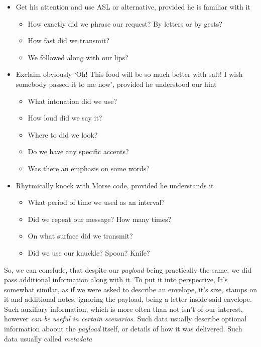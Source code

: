 \documentclass{article}
\begin{document}
\begin{itemize}
                \item Get his attention and use ASL or alternative, provided he is familiar with it
                \begin{itemize}
                    \item How exactly did we phrase our request? By letters or by gests?
                    \item How fast did we transmit?
                    \item We followed along with our lips?
                \end{itemize}

                \item Exclaim obviously `Oh! This food will be so much better with salt! I wish somebody passed it to me now', provided he understood our hint
                \begin{itemize}
                    \item What intonation did we use?
                    \item How loud did we say it?
                    \item Where to did we look?
                    \item Do we have any specific accents?
                    \item Was there an emphasis on some words?
                \end{itemize}

                \item Rhytmically knock with Morse code, provided he understands it
                \begin{itemize}
                    \item What period of time we used as an interval?
                    \item Did we repeat our message? How many times?
                    \item On what surface did we transmit?
                    \item Did we use our knuckle? Spoon? Knife?
                \end{itemize}
            \end{itemize}
            
            So, we can conclude, that despite our \emph{payload} being practically the same, we did pass additional information along with it. To put it into perspective,
            It's somewhat similar, as if we were asked to describe an envelope, it's size, stamps on it and additional notes, ignoring the payload, being a letter inside
            said envelope. Such auxiliary information, which is more often than not isn't of our interest, however \emph{can be useful in certain scenarios}. Such data
            usually describe optional information aboout the \emph{payload} itself, or details of how it was delivered. Such data usually called \emph{metadata}
\end{document}
